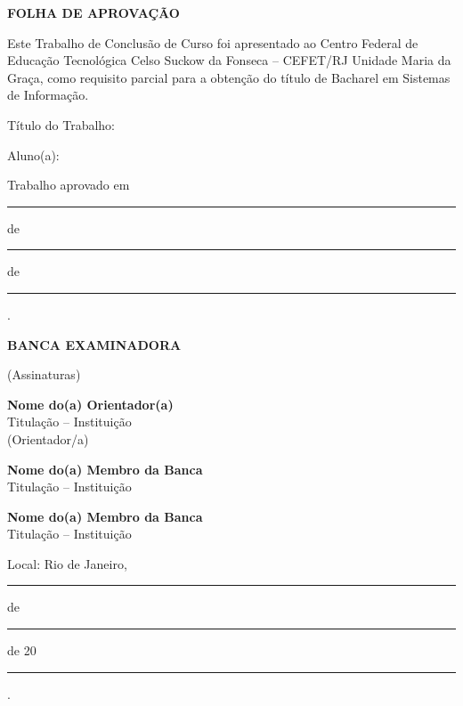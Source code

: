 \thispagestyle{empty}
\begingroup
{}

\begin{center}
    \textbf{FOLHA DE APROVAÇÃO}
\end{center}

\vspace{1.2cm}

\noindent
Este Trabalho de Conclusão de Curso foi apresentado ao Centro Federal de Educação
Tecnológica Celso Suckow da Fonseca -- CEFET/RJ Unidade Maria da Graça, como
requisito parcial para a obtenção do título de Bacharel em Sistemas de Informação.

\vspace{0.5cm}

\noindent
Título do Trabalho: \hrulefill

\vspace{0.35cm}

\noindent
Aluno(a): \hspace{0.2cm}\hrulefill

\vspace{0.35cm}

\noindent
Trabalho aprovado em \rule{1.2cm}{0.4pt} de \rule{3.4cm}{0.4pt} de \rule{1.6cm}{0.4pt}.

\vspace{1.35cm}

\begin{center}
    \textbf{BANCA EXAMINADORA}

    \vspace{1.2cm}

    (Assinaturas)

    \vspace{1.35cm}

    \textbf{Nome do(a) Orientador(a)}\\
    Titulação -- Instituição\\
    (Orientador/a)

    \vspace{1.55cm}

    \textbf{Nome do(a) Membro da Banca}\\
    Titulação -- Instituição

    \vspace{1.55cm}

    \textbf{Nome do(a) Membro da Banca}\\
    Titulação -- Instituição
\end{center}

\vfill

\noindent
Local: Rio de Janeiro, \rule{1.0cm}{0.4pt} de \rule{3.3cm}{0.4pt} de 20 \rule{1.0cm}{0.4pt}.

\endgroup
\clearpage
